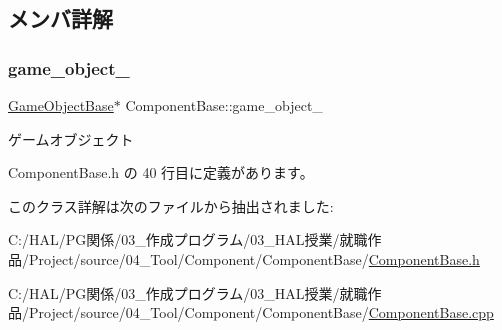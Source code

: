 \subsection{メンバ詳解}
\mbox{\label{class_component_base_a60a43b42437cd5be2b05d2f4f4dd8147}} 
\subsubsection{\texorpdfstring{game\+\_\+object\+\_\+}{game\_object\_}}
{\footnotesize\ttfamily \mbox{\hyperlink{class_game_object_base}{Game\+Object\+Base}}$\ast$ Component\+Base\+::game\+\_\+object\+\_\+\hspace{0.3cm}{\ttfamily [private]}}



ゲームオブジェクト 



 Component\+Base.\+h の 40 行目に定義があります。



このクラス詳解は次のファイルから抽出されました\+:\begin{DoxyCompactItemize}
\item 
C\+:/\+H\+A\+L/\+P\+G関係/03\+\_\+作成プログラム/03\+\_\+\+H\+A\+L授業/就職作品/\+Project/source/04\+\_\+\+Tool/\+Component/\+Component\+Base/\mbox{\hyperlink{_component_base_8h}{Component\+Base.\+h}}\item 
C\+:/\+H\+A\+L/\+P\+G関係/03\+\_\+作成プログラム/03\+\_\+\+H\+A\+L授業/就職作品/\+Project/source/04\+\_\+\+Tool/\+Component/\+Component\+Base/\mbox{\hyperlink{_component_base_8cpp}{Component\+Base.\+cpp}}\end{DoxyCompactItemize}
